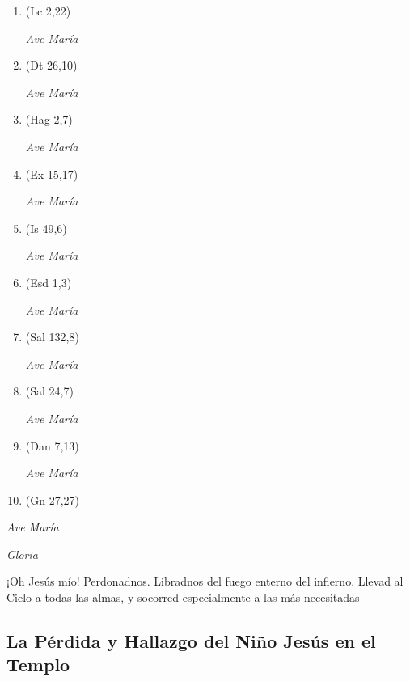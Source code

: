\documentclass[a4paper,11pt, oneside]{report}
\begin{document}
        \begin{enumerate}
          
          \item (Lc 2,22)
          
          \textit{Ave María}

          \item (Dt 26,10)
          
          \textit{Ave María}

          \item (Hag 2,7)
          
          \textit{Ave María}

          \item (Ex 15,17)
          
          \textit{Ave María}

          \item (Is 49,6)

          \textit{Ave María}

          \item (Esd 1,3)
          
          \textit{Ave María}

          \item (Sal 132,8)
          
          \textit{Ave María}

          \item (Sal 24,7)
          
          \textit{Ave María}

          \item (Dan 7,13)
          
          \textit{Ave María}

          \item (Gn 27,27)

        \end{enumerate}

        \textit{Ave María} \par
        \indent\textit{Gloria} \par
        \indent¡Oh Jesús mío! Perdonadnos. Libradnos del fuego enterno del infierno. Llevad al Cielo a todas las almas, y socorred especialmente a las más 
        necesitadas
            
      \subsection*{La Pérdida y Hallazgo del Niño Jesús en el Templo}
      
\end{document}
